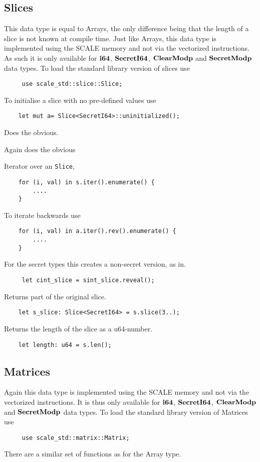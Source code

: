 \subsection{Slices}
\label{sec:slices}
This data type is equal to Arrays, the only difference being that the length of a slice is not known at compile time.
Just like Arrays, this data type is implemented using the SCALE memory and not
via the vectorized instructions.
As such it is only available for $\mathbf{i64}$, $\mathbf{SecretI64}$, $\mathbf{ClearModp}$
and $\mathbf{SecretModp}$ data types.
To load the standard library version of slices use
\begin{lstlisting}
     use scale_std::slice::Slice;
\end{lstlisting}

To initialise a slice with no pre-defined values use
\begin{lstlisting}
    let mut a= Slice<SecretI64>::uninitialized();
\end{lstlisting}

Does the obvious.

Again does the obvious

Iterator over an \verb|Slice|,
\begin{lstlisting}
    for (i, val) in s.iter().enumerate() {
        ....
    }
\end{lstlisting}
To iterate backwards use
\begin{lstlisting}
    for (i, val) in a.iter().rev().enumerate() {
        ....
    }
\end{lstlisting}

For the secret types this creates a non-secret version, as in.
\begin{lstlisting}
     let cint_slice = sint_slice.reveal();
\end{lstlisting}

Returns part of the original slice.
\begin{lstlisting}
    let s_slice: Slice<SecretI64> = s.slice(3..);
\end{lstlisting}

Returns the length of the slice as a u64-number.
\begin{lstlisting}
    let length: u64 = s.len();
\end{lstlisting}

\subsection{Matrices}
\label{sec:matrices}
Again this data type is implemented using the SCALE memory and not
via the vectorized instructions.
It is thus only available for $\mathbf{i64}$, $\mathbf{SecretI64}$, $\mathbf{ClearModp}$
and $\mathbf{SecretModp}$ data types.
To load the standard library version of Matrices use
\begin{lstlisting}
     use scale_std::matrix::Matrix;
\end{lstlisting}
There are a similar set of functions as for the Array type.

